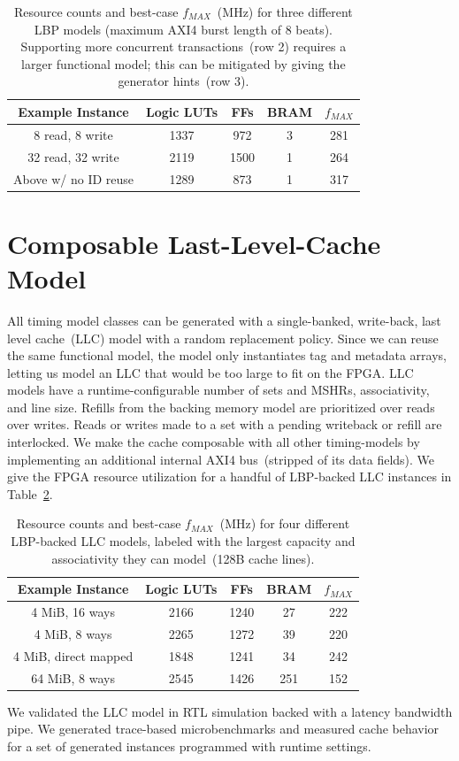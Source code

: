 \begin{table}[htb]
\centering
    \vspace{-0.05in}
    \begin{tabular}{c c c c c }
	\hline
        \textbf{Example Instance} & Logic LUTs & FFs & BRAM & $f_{MAX}$ \\
	\hline
        8 read, 8 write & 1337 & 972 & 3 &  281 \\
        32 read, 32 write & 2119 & 1500 & 1 & 264 \\
        Above w/ no ID reuse & 1289 & 873 & 1 & 317 \\
	\hline
	\end{tabular}
    \caption{Resource counts and best-case $f_{MAX}$~(MHz) for three different
    LBP models (maximum AXI4 burst length of 8 beats). Supporting more concurrent transactions~(row 2) requires a larger
    functional model; this can be mitigated by giving the generator hints~(row 3).}
\vspace{-0.3in}
\label{tbl:lbp-model-resources}
\end{table}

\vspace{-0.05in}
\section{Composable Last-Level-Cache Model}
All timing model classes can be generated with a single-banked, write-back,
last level cache~(LLC) model with a random replacement policy.  Since we can
reuse the same functional model, the model only instantiates tag and metadata
arrays, letting us model an LLC that would be too
large to fit on the FPGA. \PNAME LLC models have a runtime-configurable number of sets
and MSHRs, associativity, and line size. Refills from the backing memory model
are prioritized over reads over writes. Reads or writes made to a set with a
pending writeback or refill are interlocked.  We make the cache composable with
all other timing-models by implementing an additional internal AXI4
bus~(stripped of its data fields). We give the FPGA resource utilization for a
handful of LBP-backed LLC instances in
Table~\ref{tbl:llc-model-resources}.
\begin{table}[htb]
\centering
    \vspace{-0.05in}
    \begin{tabular}{c c c c c}
	\hline
        \textbf{Example Instance} & Logic LUTs & FFs & BRAM & $f_{MAX}$ \\
	\hline
        4 MiB, 16 ways & 2166 & 1240 & 27 & 222 \\
        4 MiB, 8 ways  & 2265 & 1272 & 39 & 220 \\
        4 MiB, direct mapped & 1848 & 1241 & 34 & 242 \\
        64 MiB, 8 ways & 2545 & 1426 & 251 & 152 \\
	\hline
	\end{tabular}
    \caption{Resource counts and best-case $f_{MAX}$~(MHz) for four different
    LBP-backed LLC models, labeled with the largest capacity and associativity they can model~(128B cache lines).}
\label{tbl:llc-model-resources}
\vspace{-0.3in}
\end{table}

We validated the LLC model in RTL simulation backed with a latency bandwidth
pipe. We generated trace-based microbenchmarks and measured cache behavior
for a set of generated instances programmed with runtime settings.
